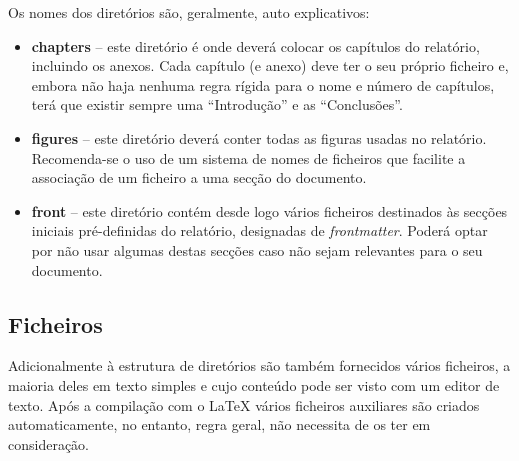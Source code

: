 Os nomes dos diretórios são, geralmente, auto explicativos:

\begin{itemize}
     \item \textbf{chapters} -- este diretório é onde deverá colocar os capítulos do relatório, incluindo os anexos. Cada capítulo (e anexo) deve ter o seu próprio ficheiro  e, embora não haja nenhuma regra rígida para o nome e número de capítulos, terá que existir sempre uma ``Introdução'' e as ``Conclusões''.

     \item \textbf{figures} -- este diretório deverá conter todas as figuras usadas no relatório. Recomenda-se o uso de um sistema de nomes de ficheiros que facilite a associação de um ficheiro a uma secção do documento.

     \item \textbf{front} -- este diretório contém desde logo vários ficheiros destinados às secções iniciais pré-definidas do relatório, designadas de \textit{frontmatter}. Poderá optar por não usar algumas destas secções caso não sejam relevantes para o seu documento.
\end{itemize}

\subsection{Ficheiros}

Adicionalmente à estrutura de diretórios são também fornecidos vários ficheiros, a maioria deles em texto simples e cujo conteúdo pode ser visto com um editor de texto. Após a compilação com o \LaTeX{} vários ficheiros auxiliares são criados automaticamente, no entanto, regra geral, não necessita de os ter em consideração.

